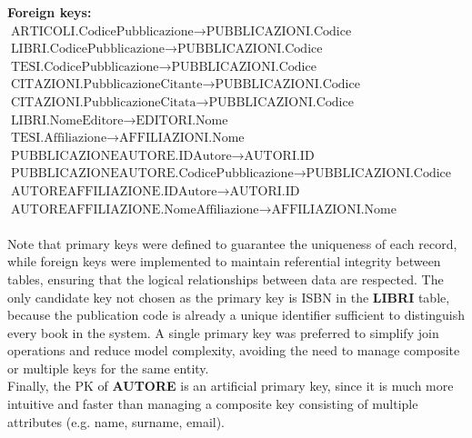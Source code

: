 \documentclass[a4paper,12pt]{article}
\begin{document}
\textbf{Foreign keys:} \\
$\text{ARTICOLI.CodicePubblicazione} \rightarrow \text{PUBBLICAZIONI.Codice}$ \\
$\text{LIBRI.CodicePubblicazione} \rightarrow \text{PUBBLICAZIONI.Codice}$ \\
$\text{TESI.CodicePubblicazione} \rightarrow \text{PUBBLICAZIONI.Codice}$ \\
$\text{CITAZIONI.PubblicazioneCitante} \rightarrow \text{PUBBLICAZIONI.Codice}$ \\
$\text{CITAZIONI.PubblicazioneCitata} \rightarrow \text{PUBBLICAZIONI.Codice}$ \\
$\text{LIBRI.NomeEditore} \rightarrow \text{EDITORI.Nome}$ \\
$\text{TESI.Affiliazione} \rightarrow \text{AFFILIAZIONI.Nome}$ \\
$\text{PUBBLICAZIONEAUTORE.IDAutore} \rightarrow \text{AUTORI.ID}$ \\
$\text{PUBBLICAZIONEAUTORE.CodicePubblicazione} \rightarrow \text{PUBBLICAZIONI.Codice}$ \\
$\text{AUTOREAFFILIAZIONE.IDAutore} \rightarrow \text{AUTORI.ID}$ \\
$\text{AUTOREAFFILIAZIONE.NomeAffiliazione} \rightarrow \text{AFFILIAZIONI.Nome}$ \\
\\
Note that primary keys were defined to guarantee the uniqueness of each record, while foreign keys were implemented to maintain referential integrity between tables, ensuring that the logical relationships between data are respected. The only candidate key not chosen as the primary key is ISBN in the \textbf{LIBRI} table, because the publication code is already a unique identifier sufficient to distinguish every book in the system. A single primary key was preferred to simplify join operations and reduce model complexity, avoiding the need to manage composite or multiple keys for the same entity. \\
Finally, the PK of \textbf{AUTORE} is an artificial primary key, since it is much more intuitive and faster than managing a composite key consisting of multiple attributes (e.g. name, surname, email).
\end{document}

